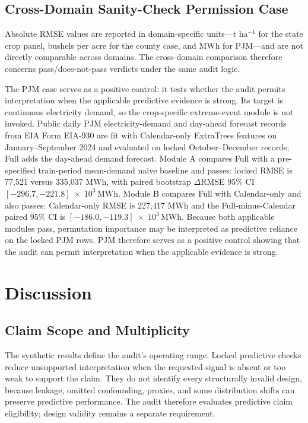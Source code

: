 \documentclass[conference]{IEEEtran}
\begin{document}
\subsection{Cross-Domain Sanity-Check Permission Case}
Absolute RMSE values are reported in domain-specific units---t ha$^{-1}$ for the
state crop panel, bushels per acre for the county case, and MWh for PJM---and are
not directly comparable across domains. The cross-domain comparison therefore
concerns pass/does-not-pass verdicts under the same audit logic.

The PJM case serves as a positive control: it tests whether the audit permits
interpretation when the applicable predictive evidence is strong. Its target is
continuous electricity demand, so the crop-specific extreme-event module is not
invoked. Public daily PJM electricity-demand and day-ahead forecast records from
EIA Form EIA-930
\cite{EIA930} are fit with Calendar-only ExtraTrees features on
January--September 2024 and evaluated on locked October--December records; Full
adds the day-ahead demand forecast. Module A compares Full with a pre-specified
train-period mean-demand naive baseline and passes: locked RMSE is 77,521 versus
335,037 MWh, with paired bootstrap $\Delta$RMSE 95\% CI
$[-296.7, -221.8]\;\times\;10^3\,\mathrm{MWh}$. Module B compares Full with Calendar-only and
also passes: Calendar-only RMSE is 227,417 MWh and the Full-minus-Calendar paired
95\% CI is $[-186.0, -119.3]\;\times\;10^3\,\mathrm{MWh}$. Because both applicable
modules pass, permutation importance may be interpreted as predictive reliance
on the locked PJM rows. PJM therefore serves as a positive control showing that
the audit can permit interpretation when the applicable evidence is strong.

\section{Discussion}
\subsection{Claim Scope and Multiplicity}
The synthetic results define the audit's operating range. Locked predictive
checks reduce unsupported interpretation when the requested signal is absent or
too weak to support the claim. They do not identify every structurally invalid
design, because leakage, omitted confounding, proxies, and some distribution
shifts can preserve predictive performance. The audit therefore evaluates
predictive claim eligibility; design validity remains a separate requirement.
\end{document}
